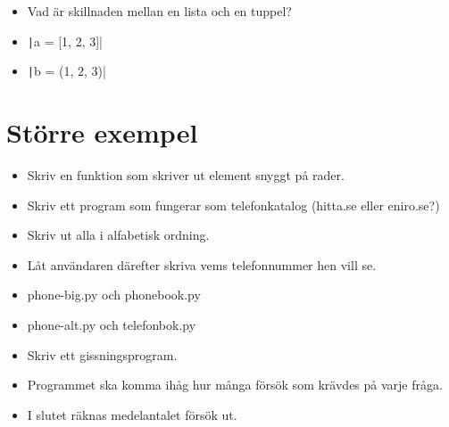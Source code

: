 \begin{frame}[fragile]
  \begin{exercise}
    \begin{itemize}
      \item Vad är skillnaden mellan en lista och en tuppel?
      \item \texttt|a = [1, 2, 3]|
      \item \texttt|b = (1, 2, 3)|
    \end{itemize}
  \end{exercise}
\end{frame}


\section{Större exempel}

\begin{frame}
  \begin{exercise}
    \begin{itemize}
      \item Skriv en funktion som skriver ut element snyggt på rader.
    \end{itemize}
  \end{exercise}
\end{frame}

\begin{frame}
  \begin{exercise}[Telefonbok]
    \begin{itemize}
      \item Skriv ett program som fungerar som telefonkatalog (hitta.se eller 
        eniro.se?)
      \item Skriv ut alla i alfabetisk ordning.
      \item Låt användaren därefter skriva vems telefonnummer hen vill se.
    \end{itemize}
  \end{exercise}

  \pause

  \begin{solution}
    \begin{itemize}
      \item phone-big.py och phonebook.py
      \item phone-alt.py och telefonbok.py
    \end{itemize}
  \end{solution}
\end{frame}

\begin{frame}
  \begin{exercise}
    \begin{itemize}
      \item Skriv ett gissningsprogram.
      \item Programmet ska komma ihåg hur många försök som krävdes på varje 
        fråga.
      \item I slutet räknas medelantalet försök ut.
    \end{itemize}
  \end{exercise}
\end{frame}

